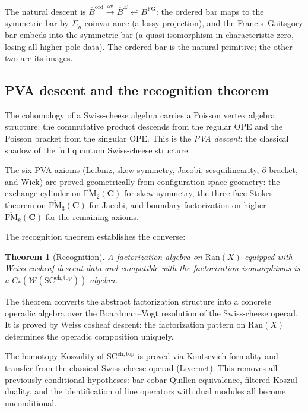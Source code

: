 \documentclass[11pt,reqno]{amsart}
\newtheorem{theorem}{Theorem}[section]
\theoremstyle{definition}
\theoremstyle{remark}
\newcommand{\barB}{\overline{B}}
\newcommand{\Ran}{\mathrm{Ran}}
\newcommand{\FM}{\overline{\mathrm{FM}}}
\renewcommand{\Bbbk}{\mathbf{C}}
\numberwithin{equation}{section}
\begin{document}
The natural descent is
$\barB^{\mathrm{ord}} \xrightarrow{\mathrm{av}}
\barB^{\Sigma} \hookleftarrow B^{\mathrm{FG}}$:
the ordered bar maps to the symmetric bar by
$\Sigma_n$-coinvariance (a lossy projection), and the
Francis--Gaitsgory bar embeds into the symmetric bar
(a quasi-isomorphism in characteristic zero, losing all
higher-pole data). The ordered bar is the natural
primitive; the other two are its images.

\subsection{PVA descent and the recognition theorem}
\label{ssec:pva}

The cohomology of a Swiss-cheese algebra carries a Poisson
vertex algebra structure: the commutative product descends
from the regular OPE and the Poisson bracket from the singular
OPE. This is the \emph{PVA descent}: the classical shadow of
the full quantum Swiss-cheese structure.

The six PVA axioms (Leibniz, skew-symmetry, Jacobi, sesqui\-linearity,
$\partial$-bracket, and Wick) are proved geometrically from
configuration-space geometry: the exchange cylinder on
$\FM_2(\Bbbk)$ for skew-symmetry, the three-face Stokes
theorem on $\FM_3(\Bbbk)$ for Jacobi, and boundary
factorization on higher $\FM_k(\Bbbk)$ for the remaining
axioms.

The recognition theorem establishes the converse:

\begin{theorem}[Recognition]
\label{thm:recognition}
A factorization algebra on\/ $\Ran(X)$ equipped with Weiss
cosheaf descent data and compatible with the factorization
isomorphisms is a $C_*(\mathcal{W}(\mathrm{SC}^{\mathrm{ch,top}}))$-algebra.
\end{theorem}

The theorem converts the abstract factorization structure
into a concrete operadic algebra over the Boardman--Vogt
resolution of the Swiss-cheese operad. It is proved by Weiss
cosheaf descent: the factorization pattern on $\Ran(X)$
determines the operadic composition uniquely.

The homotopy-Koszulity of $\mathrm{SC}^{\mathrm{ch,top}}$
is proved via Kontsevich formality and transfer from the
classical Swiss-cheese operad (Livernet). This removes all
previously conditional hypotheses: bar-cobar Quillen
equivalence, filtered Koszul duality, and the identification
of line operators with dual modules all become unconditional.
\end{document}
